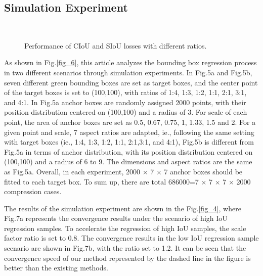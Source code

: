 \documentclass[lettersize,journal]{IEEEtran}
\begin{document}
	\subsection{Simulation Experiment}
		\begin{figure*} [t!]
		\hspace{.15in}
		\hspace{.15in}
		\hspace{.15in}
		\\
		\hspace{.15in}
		\hspace{.15in}
		\caption{Performance of CIoU and SIoU losses with different ratios.} 
		\label{fig_7} 
	\end{figure*}
	\par As shown in Fig.\ref{fig_6}, this article analyzes the bounding box regression process in two different scenarios through simulation experiments. In Fig.5a and Fig.5b, seven different green bounding boxes are set as target boxes, and the center point of the target boxes is set to (100,100), with ratios of 1:4, 1:3, 1:2, 1:1, 2:1, 3:1, and 4:1. In Fig.5a anchor boxes are randomly assigned 2000 points, with their position distribution centered on (100,100) and a radius of 3. For scale of each point, the area of anchor boxes are set as 0.5, 0.67, 0.75, 1, 1.33, 1.5 and 2. For a given point and scale, 7 aspect ratios are adapted, ie., following the same setting with target boxes (ie., 1:4, 1:3, 1:2, 1:1, 2:1,3:1, and 4:1), Fig.5b is different from Fig.5a in terms of anchor distribution, with its position distribution centered on (100,100) and a radius of 6 to 9. The dimensions and aspect ratios are the same as Fig.5a. Overall, in each experiment, 2000 × 7 × 7 anchor boxes should be fitted to each target box. To sum up, there are total 686000=7 × 7 × 7 × 2000 compression cases.
	\par The results of the simulation experiment are shown in the Fig.\ref{fig_4}, where Fig.7a represents the convergence results under the scenario of high IoU regression samples. To accelerate the regression of high IoU samples, the scale factor ratio is set to 0.8. The convergence results in the low IoU regression sample scenario are shown in Fig.7b, with the ratio set to 1.2. It can be seen that the convergence speed of our method represented by the dashed line in the figure is better than the existing methods.
\end{document}
